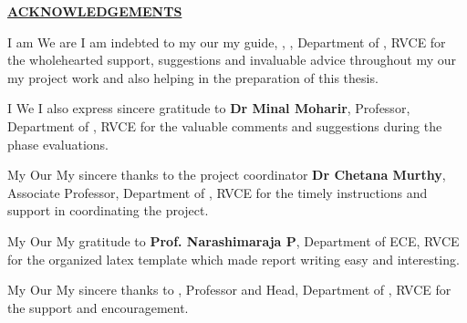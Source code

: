 \thispagestyle{empty}
\ifIDP \vspace{-1cm}\fi

\begin{center}
	\Large\textbf{\underline{ACKNOWLEDGEMENTS}} \par
\end{center}

\ifPG I am \else
\ifStuNameBUsed We are \else I am \fi\fi indebted to 
\ifPG my \else\ifStuNameBUsed our \else my \fi\fi guide, 
\textbf{\printGuideNameA}, \printGuideDesigA, Department of 
\printGuideDeptAInSF, RVCE for the wholehearted support, suggestions 
and invaluable advice throughout 
\ifPG my \else\ifStuNameBUsed our \else my \fi\fi project work and 
also helping in the preparation of this thesis.\\ \par

\ifPG I \else \ifStuNameBUsed We \else I \fi\fi also express sincere gratitude to 
\textbf{Dr Minal Moharir}, Professor, Department of \printPanelMemberDeptAInSF, RVCE for the 
valuable comments and suggestions during the phase evaluations.\\ \par

\ifPG My \else \ifStuNameBUsed Our \else My \fi\fi sincere thanks to the project coordinator 
\textbf{Dr Chetana Murthy}, Associate Professor, Department of \printProjectMemberDeptAInSF, RVCE for the 
timely instructions and support in coordinating the project.\\ \par

\ifPG My \else \ifStuNameBUsed Our \else My \fi\fi gratitude to 
\textbf{Prof. Narashimaraja P}, Department of ECE, RVCE for the organized 
latex template which made report writing easy and interesting.\\ \par

\ifPG My \else \ifStuNameBUsed Our \else My \fi\fi sincere thanks to 
\textbf{\printHOD}, Professor and Head, Department of 
\ifIDP \printGuideDeptAInLF\else\printDepartmentLF\fi, RVCE for the 
support and encouragement.\\ \par

